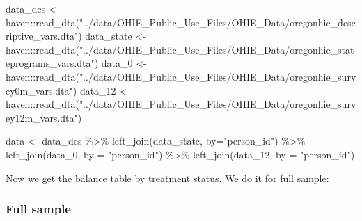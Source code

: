 \documentclass[
  letterpaper,
  DIV=11,
  numbers=noendperiod]{scrartcl}
\newenvironment{Shaded}{\begin{snugshade}}{\end{snugshade}}
\newcommand{\AttributeTok}[1]{\textcolor[rgb]{0.40,0.45,0.13}{#1}}
\newcommand{\FunctionTok}[1]{\textcolor[rgb]{0.28,0.35,0.67}{#1}}
\newcommand{\NormalTok}[1]{\textcolor[rgb]{0.00,0.23,0.31}{#1}}
\newcommand{\OtherTok}[1]{\textcolor[rgb]{0.00,0.23,0.31}{#1}}
\newcommand{\SpecialCharTok}[1]{\textcolor[rgb]{0.37,0.37,0.37}{#1}}
\newcommand{\StringTok}[1]{\textcolor[rgb]{0.13,0.47,0.30}{#1}}
\begin{document}
\begin{Shaded}
\begin{Highlighting}[]
\NormalTok{data\_des }\OtherTok{\textless{}{-}}\NormalTok{ haven}\SpecialCharTok{::}\FunctionTok{read\_dta}\NormalTok{(}\StringTok{"../data/OHIE\_Public\_Use\_Files/OHIE\_Data/oregonhie\_descriptive\_vars.dta"}\NormalTok{)}
\NormalTok{data\_state }\OtherTok{\textless{}{-}}\NormalTok{ haven}\SpecialCharTok{::}\FunctionTok{read\_dta}\NormalTok{(}\StringTok{"../data/OHIE\_Public\_Use\_Files/OHIE\_Data/oregonhie\_stateprograms\_vars.dta"}\NormalTok{)}
\NormalTok{data\_0 }\OtherTok{\textless{}{-}}\NormalTok{ haven}\SpecialCharTok{::}\FunctionTok{read\_dta}\NormalTok{(}\StringTok{"../data/OHIE\_Public\_Use\_Files/OHIE\_Data/oregonhie\_survey0m\_vars.dta"}\NormalTok{)}
\NormalTok{data\_12 }\OtherTok{\textless{}{-}}\NormalTok{ haven}\SpecialCharTok{::}\FunctionTok{read\_dta}\NormalTok{(}\StringTok{"../data/OHIE\_Public\_Use\_Files/OHIE\_Data/oregonhie\_survey12m\_vars.dta"}\NormalTok{)}

\NormalTok{data }\OtherTok{\textless{}{-}}\NormalTok{ data\_des }\SpecialCharTok{\%\textgreater{}\%} 
  \FunctionTok{left\_join}\NormalTok{(data\_state, }\AttributeTok{by=}\StringTok{"person\_id"}\NormalTok{) }\SpecialCharTok{\%\textgreater{}\%} 
  \FunctionTok{left\_join}\NormalTok{(data\_0, }\AttributeTok{by =} \StringTok{"person\_id"}\NormalTok{) }\SpecialCharTok{\%\textgreater{}\%} 
  \FunctionTok{left\_join}\NormalTok{(data\_12, }\AttributeTok{by =} \StringTok{"person\_id"}\NormalTok{)}
\end{Highlighting}
\end{Shaded}

Now we get the balance table by treatment status. We do it for full
sample:

\subsubsection{Full sample}\label{full-sample}
\end{document}
